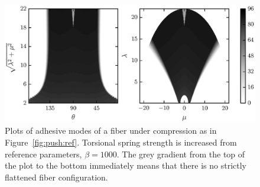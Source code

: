 	\begin{figure}[t]
		\begin{center}
			\includegraphics{./fig/ch3/push/b1000/grid.eps}
		\end{center}	
		\caption{Plots of adhesive modes of a fiber under compression as in Figure~\ref{fig:push:ref}. Torsional spring strength is increased from reference parameters, $\beta=1000$. The grey gradient from the top of the plot to the bottom immediately means that there is no strictly flattened fiber configuration.
		\label{fig:push:b1000}}
	\end{figure}
	
